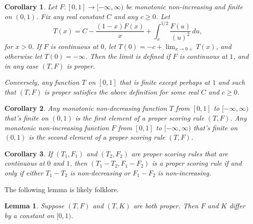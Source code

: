 \documentclass[11pt]{amsart} %
\newtheorem{lem}{Lemma}
\newtheorem{cor}{Corollary}
\begin{document}
\begin{cor}\label{cor:F}
Let $F:[0,1]\to[-\infty,\infty)$ be monotonic non-increasing and finite on $(0,1)$.
Fix any real constant $C$ and any $c\ge 0$. Let
$$
	T(x) = C-\frac{(1-x)F(x)}{x}+\int_{x}^{1/2} \frac{F(u)}{(u)^2} \, du,
$$
for $x>0$. If $F$ is continuous at $0$, let $T(0)=-c+\lim_{x\to 0+} T(x)$, and otherwise
let $T(0)=-\infty$. Then the limit is defined if $F$ is continuous at $1$, and in any case $(T,F)$ is proper.

Conversely, any function $T$ on $[0,1]$ that is finite except perhaps at $1$ and such that
$(T,F)$ is proper satisfies the above definition for some real $C$ and $c\ge 0$. 
\end{cor}

\begin{cor}
Any monotonic non-decreasing function $T$ from $[0,1]$ to $[-\infty,\infty)$ that's finite on $(0,1)$ is the first 
element of a proper scoring rule $(T,F)$. Any monotonic non-increasing function $F$ from $[0,1]$ to 
$[-\infty,\infty)$ that's finite on $(0,1)$ is the second element of a proper scoring rule $(T,F)$.
\end{cor}

\begin{cor}
If $(T_1,F_1)$ and $(T_2,F_2)$ are proper scoring rules that are continuous at $0$ and $1$, then 
$(T_1-T_2,F_1-F_2)$ is a proper scoring rule if and only if either $T_1-T_2$ is non-decreasing or
$F_1-F_2$ is non-increasing.
\end{cor}

The following lemma is likely folklore.

\begin{lem}\label{lem:unique}
Suppose $(T,F)$ and $(T,K)$ are both proper. Then $F$ and $K$ differ by a constant on $[0,1)$.
\end{lem}
\end{document}
